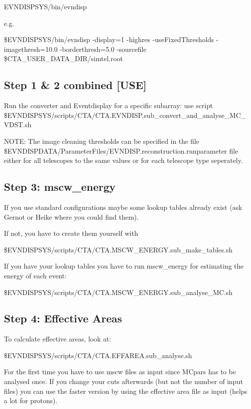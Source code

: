 \documentclass[titlepage,a4paper,twoside,11pt]{report}
\begin{document}
EVNDISPSYS/bin/evndisp

e.g. 

\$EVNDISPSYS/bin/evndisp -display=1 -highres -useFixedThresholds -imagethresh=10.0 -borderthresh=5.0 -sourcefile \$CTA\_USER\_DATA\_DIR/simtel.root

\subsection{Step 1 \& 2 combined [USE]}

Run the converter and Eventdisplay for a specific subarray: use script \$EVNDISPSYS/scripts/CTA/CTA.EVNDISP.sub\_convert\_and\_analyse\_MC\_VDST.sh

NOTE: The image cleaning thresholds can be specified in the file \$EVNDISPDATA/ParameterFiles/EVNDISP.reconstruction.runparameter file either
for all telescopes to the same values or for each telescope type seperately. 

\subsection{Step 3: mscw\_energy}

If you use standard configurations maybe some lookup tables already exist (ask Gernot or Heike where you could find them).

If not, you have to create them yourself with

\$EVNDISPSYS/scripts/CTA/CTA.MSCW\_ENERGY.sub\_make\_tables.sh

If you have your lookup tables you have to run mscw\_energy for estimating the energy of each event: 

\$EVNDISPSYS/scripts/CTA/CTA.MSCW\_ENERGY.sub\_analyse\_MC.sh

\subsection{Step 4: Effective Areas}

To calculate effective areas, look at:

\$EVNDISPSYS/scripts/CTA/CTA.EFFAREA.sub\_analyse.sh

For the first time you have to use mscw files as input since MCpars has to be analysed once. 
If you change your cuts afterwards (but not the number of input files) you can use the faster version by using
the effective area file as input (helps a lot for protons).

\end{document}
